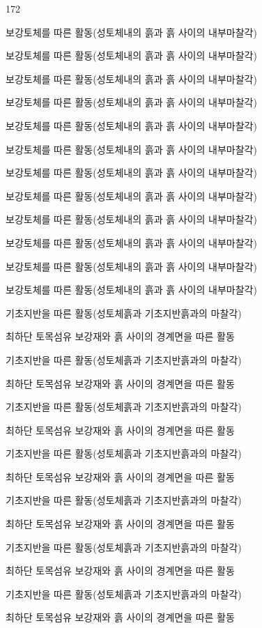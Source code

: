 \documentclass[12pt, a4paper, oneside]{book}
\begin{document}
			\begin{dingautolist}{172}
			\setlength\itemsep{-1.0em}
			\setlength\leftmargin{8cm}
			\setlength\rightmargin{10cm}
			\item	보강토체를 따른 활동(성토체내의 흙과 흙 사이의 내부마찰각) 
			\item	보강토체를 따른 활동(성토체내의 흙과 흙 사이의 내부마찰각) 
			\item	보강토체를 따른 활동(성토체내의 흙과 흙 사이의 내부마찰각) 
			\item	보강토체를 따른 활동(성토체내의 흙과 흙 사이의 내부마찰각) 
			\item	보강토체를 따른 활동(성토체내의 흙과 흙 사이의 내부마찰각) 
			\item	보강토체를 따른 활동(성토체내의 흙과 흙 사이의 내부마찰각) 
			\item	보강토체를 따른 활동(성토체내의 흙과 흙 사이의 내부마찰각) 
			\item	보강토체를 따른 활동(성토체내의 흙과 흙 사이의 내부마찰각) 
			\item	보강토체를 따른 활동(성토체내의 흙과 흙 사이의 내부마찰각) 
			\item	보강토체를 따른 활동(성토체내의 흙과 흙 사이의 내부마찰각) 
			\item	보강토체를 따른 활동(성토체내의 흙과 흙 사이의 내부마찰각) 
			\item	보강토체를 따른 활동(성토체내의 흙과 흙 사이의 내부마찰각) 
			\item	기초지반을 따른 활동(성토체흙과 기초지반흙과의 마찰각) 
			\item	최하단 토목섬유 보강재와 흙 사이의 경계면을 따른 활동 
			\item	기초지반을 따른 활동(성토체흙과 기초지반흙과의 마찰각) 
			\item	최하단 토목섬유 보강재와 흙 사이의 경계면을 따른 활동 
			\item	기초지반을 따른 활동(성토체흙과 기초지반흙과의 마찰각) 
			\item	최하단 토목섬유 보강재와 흙 사이의 경계면을 따른 활동 
			\item	기초지반을 따른 활동(성토체흙과 기초지반흙과의 마찰각) 
			\item	최하단 토목섬유 보강재와 흙 사이의 경계면을 따른 활동 
			\item	기초지반을 따른 활동(성토체흙과 기초지반흙과의 마찰각) 
			\item	최하단 토목섬유 보강재와 흙 사이의 경계면을 따른 활동 
			\item	기초지반을 따른 활동(성토체흙과 기초지반흙과의 마찰각) 
			\item	최하단 토목섬유 보강재와 흙 사이의 경계면을 따른 활동 
			\item	기초지반을 따른 활동(성토체흙과 기초지반흙과의 마찰각) 
			\item	최하단 토목섬유 보강재와 흙 사이의 경계면을 따른 활동 
			\end{dingautolist}
\end{document}

